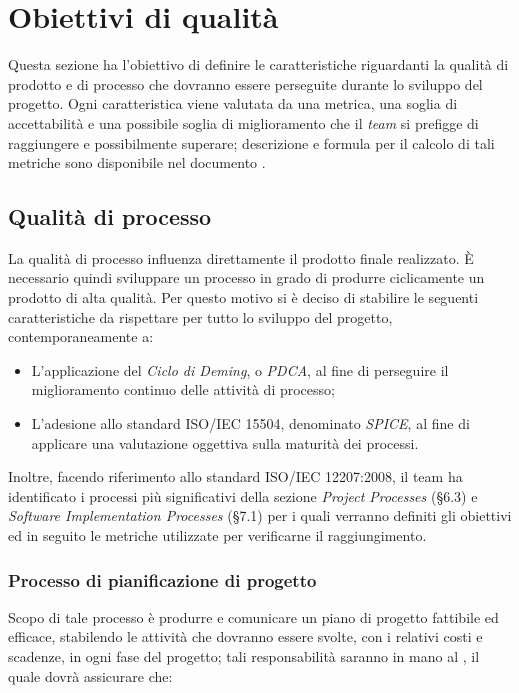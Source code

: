 \section{Obiettivi di qualità}
Questa sezione ha l'obiettivo di definire le caratteristiche riguardanti la qualità di prodotto e di processo che dovranno essere perseguite durante lo sviluppo del progetto.
Ogni caratteristica viene valutata da una metrica, una soglia di accettabilità e una possibile soglia di miglioramento che il \emph{team} si prefigge di raggiungere e possibilmente superare; descrizione e formula per il calcolo di tali metriche sono disponibile nel documento \NdP.

\subsection{Qualità di processo}
La qualità di processo influenza direttamente il prodotto finale realizzato. È necessario quindi sviluppare un processo in grado di produrre ciclicamente un prodotto di alta qualità. Per questo motivo si è deciso di stabilire le seguenti caratteristiche da rispettare per tutto lo sviluppo del progetto, contemporaneamente a:
	\begin{itemize}
	\item L'applicazione del \emph{Ciclo di Deming}, o \emph{PDCA}, al fine di perseguire il miglioramento continuo delle attività di processo;
	\item L'adesione allo standard ISO/IEC 15504, denominato \emph{SPICE}, al fine di applicare una valutazione oggettiva sulla maturità dei processi.
	\end{itemize} 

Inoltre, facendo riferimento allo standard ISO/IEC 12207:2008, il team ha identificato i processi più significativi della sezione \emph{Project Processes} (§6.3) e  \emph{Software Implementation Processes} (§7.1) per i quali verranno definiti gli obiettivi ed in seguito le metriche utilizzate per verificarne il raggiungimento.

\subsubsection{Processo di pianificazione di progetto}
Scopo di tale processo è produrre e comunicare un piano di progetto fattibile ed efficace, stabilendo le attività che dovranno essere svolte, con i relativi costi e scadenze, in ogni fase del progetto; tali responsabilità saranno in mano al \Res, il quale dovrà assicurare che:

